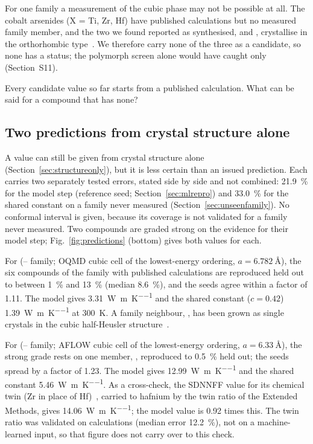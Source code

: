 For one family a measurement of the cubic phase may not be possible at all. The cobalt arsenides
 (X = Ti, Zr, Hf) have published calculations but no measured family member, and the two
we found reported as synthesised,  and , crystallise in the orthorhombic
 type~\cite{kleinke1998crystal}. We therefore carry none of the three as a candidate, so
none has a status; the polymorph screen alone would have caught only  (Section~S11).

Every candidate value so far starts from a published calculation. What can be said for a compound that has
none?

\subsection{Two predictions from crystal structure alone}
\label{sec:structonly}

A value can still be given from crystal structure alone (Section~\ref{sec:structureonly}), but it is
less certain than an issued prediction. Each carries two separately tested errors, stated side by
side and not combined: \SI{21.9}{\percent} for the model step (reference seed;
Section~\ref{sec:mlrepro}) and \SI{33.0}{\percent} for the shared constant on a family never
measured (Section~\ref{sec:unseenfamily}). No conformal interval is given, because its coverage is
not validated for a family never measured. Two compounds are graded strong on the evidence for their
model step; Fig.~\ref{fig:predictions} (bottom) gives both values for each.

For  (-- family; OQMD cubic cell of the lowest-energy ordering,
$a=\SI{6.782}{\angstrom}$), the six compounds of the family with published calculations are reproduced held
out to between \SI{1}{\percent} and \SI{13}{\percent} (median \SI{8.6}{\percent}), and the seeds
agree within a factor of \num{1.11}. The model gives \SI{3.31}{\watt\per\meter\per\kelvin} and the
shared constant ($c=\num{0.42}$) \SI{1.39}{\watt\per\meter\per\kelvin} at \SI{300}{\kelvin}. A family neighbour, , has been grown as single
crystals in the cubic half-Heusler structure~\cite{agarwal2026thermodyna}.

For  (-- family; AFLOW cubic cell of the lowest-energy ordering,
$a=\SI{6.33}{\angstrom}$), the strong grade rests on one member, , reproduced to
\SI{0.5}{\percent} held out; the seeds spread by a factor of \num{1.23}. The model gives
\SI{12.99}{\watt\per\meter\per\kelvin} and the shared constant
\SI{5.46}{\watt\per\meter\per\kelvin}. As a cross-check, the SDNNFF value for its chemical twin
 (Zr in place of Hf)~\cite{rodriguez2023millionsca}, carried to hafnium by the twin ratio of the Extended
Methods, gives \SI{14.06}{\watt\per\meter\per\kelvin}; the model value is \num{0.92} times this. The
twin ratio was validated on calculations (median error \SI{12.2}{\percent}), not on a
machine-learned input, so that figure does not carry over to this check.

